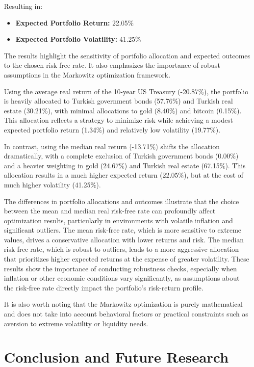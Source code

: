 \documentclass[
]{article}
\begin{document}
Resulting in:
\begin{itemize}
  \item \textbf{Expected Portfolio Return:} 22.05\%
  \item \textbf{Expected Portfolio Volatility:} 41.25\%
\end{itemize}

The results highlight the sensitivity of portfolio allocation and expected outcomes to the chosen risk-free rate. It also emphasizes the importance of robust assumptions in the Markowitz optimization framework.

Using the average real return of the 10-year US Treasury (-20.87\%), the portfolio is heavily allocated to Turkish government bonds (57.76\%) and Turkish real estate (30.21\%), with minimal allocations to gold (8.40\%) and bitcoin (0.15\%). This allocation reflects a strategy to minimize risk while achieving a modest expected portfolio return (1.34\%) and relatively low volatility (19.77\%).

In contrast, using the median real return (-13.71\%) shifts the allocation dramatically, with a complete exclusion of Turkish government bonds (0.00\%) and a heavier weighting in gold (24.67\%) and Turkish real estate (67.15\%). This allocation results in a much higher expected return (22.05\%), but at the cost of much higher volatility (41.25\%).

The differences in portfolio allocations and outcomes illustrate that the choice between the mean and median real risk-free rate can profoundly affect optimization results, particularly in environments with volatile inflation and significant outliers. The mean risk-free rate, which is more sensitive to extreme values, drives a conservative allocation with lower returns and risk. The median risk-free rate, which is robust to outliers, leads to a more aggressive allocation that prioritizes higher expected returns at the expense of greater volatility. These results show the importance of conducting robustness checks, especially when inflation or other economic conditions vary significantly, as assumptions about the risk-free rate directly impact the portfolio's risk-return profile.

It is also worth noting that the Markowitz optimization is purely mathematical and does not take into account behavioral factors or practical constraints such as aversion to extreme volatility or liquidity needs. 

\section{Conclusion and Future Research}\label{conclusion}
\end{document}
